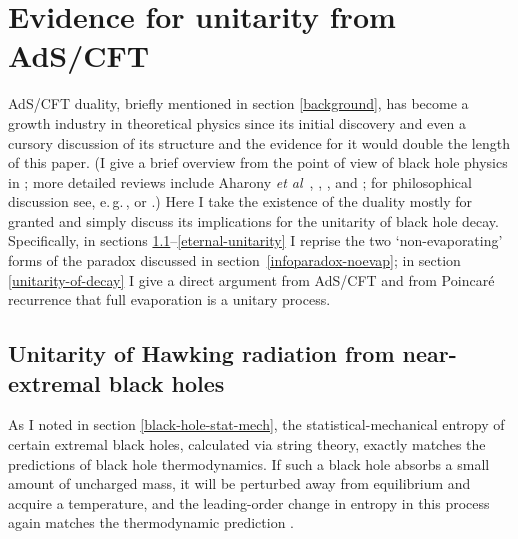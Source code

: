 \documentclass{article}
\newcommand{\egc}{\mbox{e.\,g.\,}}
\begin{document}
\section{Evidence for unitarity from AdS/CFT}\label{adscft}

AdS/CFT duality, briefly mentioned in section \ref{background}, has become a growth industry in theoretical physics since its initial discovery and even a cursory discussion of its structure and the evidence for it would double the length of this paper. (I give a brief overview from the point of view of black hole physics in ; more detailed reviews include Aharony \emph{et al}~\citeyear{aharonyadscftreview}, , , and ; for philosophical discussion see, \egc,  or .) Here I take the existence of the duality mostly for granted and simply discuss its implications for the unitarity of black hole decay. Specifically, in sections \ref{near-extremal-unitarity}--\ref{eternal-unitarity} I reprise the two `non-evaporating' forms of the paradox discussed in section~\ref{infoparadox-noevap}; in section \ref{unitarity-of-decay} I give a direct argument from AdS/CFT and from Poincar\'{e} recurrence that full evaporation is a unitary process.

\subsection{Unitarity of Hawking radiation from near-extremal black holes}\label{near-extremal-unitarity}

As I noted in section \ref{black-hole-stat-mech}, the statistical-mechanical entropy of certain extremal black holes, calculated via string theory, exactly matches the predictions of black hole thermodynamics. If such a black hole absorbs a small amount of uncharged mass, it will be perturbed away from equilibrium and acquire a temperature, and the leading-order change in entropy in this process again matches the thermodynamic prediction \cite{horowitzstrominger}. 
\end{document}
